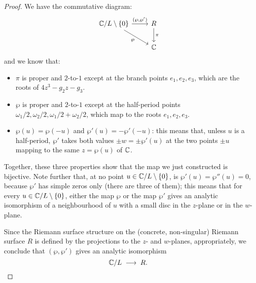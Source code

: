 \documentclass[12pt]{article}
\begin{document}
\begin{proof}
We have the commutative diagram:
\[
\begin{tikzcd}
\C/L \setminus \{0\} \arrow[r, "{(\wp,\wp')}"] \arrow[dr, "{\wp}"'] & R \arrow[d, "{\pi}"] \\
 & \C
\end{tikzcd}
\]
and we know that:
\begin{itemize}
    \item $\pi$ is proper and $2$-to-$1$ except at the branch points $e_1,e_2,e_3$, which are the roots of $4z^3 - g_2z - g_3$.
    \item $\wp$ is proper and $2$-to-$1$ except at the half-period points $\omega_1/2,\omega_2/2,\omega_1/2+\omega_2/2$, which map to the roots $e_1,e_2,e_3$.
    \item $\wp(u)=\wp(-u)$ and $\wp'(u)=-\wp'(-u)$: this means that, unless $u$ is a half-period, $\wp'$ takes both values $\pm w = \pm \wp'(u)$ at the two points $\pm u$ mapping to the same $z=\wp(u)$ of $\mathbb{C}$.
\end{itemize}

Together, these three properties show that the map we just constructed is bijective. 
Note further that, at no point $u \in \mathbb{C}/L \setminus \{0\}$, is $\wp'(u)=\wp''(u)=0$, because $\wp'$ has simple zeros only (there are three of them); 
this means that for every $u \in \mathbb{C}/L \setminus \{0\}$, either the map $\wp$ or the map $\wp'$ gives an analytic isomorphism of a neighbourhood of $u$ with a small disc in the $z$-plane or in the $w$-plane.

Since the Riemann surface structure on the (concrete, non-singular) Riemann surface $R$ is defined by the projections to the $z$- and $w$-planes, appropriately, we conclude that $(\wp, \wp')$ gives an analytic isomorphism
\[
\mathbb{C}/L \;\longrightarrow\; R.
\]
\end{proof}
\end{document}
